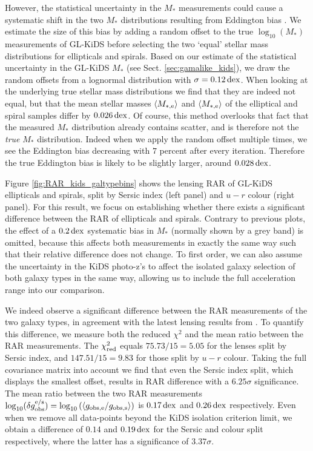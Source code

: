 \documentclass[usenatbib]{mnras}
\newcommand{\lan}{\langle}
\newcommand{\ran}{\rangle}
\newcommand{\un}[1]{_{\rm #1}}
\newcommand{\dex}{\, {\rm dex}}
\begin{document}
However, the statistical uncertainty in the $M_*$ measurements could cause a systematic shift in the two $M_*$ distributions resulting from Eddington bias \cite[]{eddington1913}. We estimate the size of this bias by adding a random offset to the true $\log_{10}(M_*)$ measurements of GL-KiDS before selecting the two `equal' stellar mass distributions for ellipticals and spirals. Based on our estimate of the statistical uncertainty in the GL-KiDS $M_*$ (see Sect. \ref{sec:gamalike_kids}), we draw the random offsets from a lognormal distribution with $\sigma = 0.12 \dex$. When looking at the underlying true stellar mass distributions we find that they are indeed not equal, but that the mean stellar masses $\lan M\un{*,e} \ran$ and $\lan M\un{*,e} \ran$ of the elliptical and spiral samples differ by $0.026 \dex$. Of course, this method overlooks that fact that the measured $M_*$ distribution already contains scatter, and is therefore not the \emph{true} $M_*$ distribution. Indeed when we apply the random offset multiple times, we see the Eddington bias decreasing with $7$ percent after every iteration. Therefore the true Eddington bias is likely to be slightly larger, around $0.028 \dex$.

Figure \ref{fig:RAR_kids_galtypebins} shows the lensing RAR of GL-KiDS ellipticals and spirals, split by Sersic index (left panel) and $u-r$ colour (right panel). For this result, we focus on establishing whether there exists a significant difference between the RAR of ellipticals and spirals. Contrary to previous plots, the effect of a $0.2 \dex$ systematic bias in $M_*$ (normally shown by a grey band) is omitted, because this affects both measurements in exactly the same way such that their relative difference does not change. To first order, we can also assume the uncertainty in the KiDS photo-z's to affect the isolated galaxy selection of both galaxy types in the same way, allowing us to include the full acceleration range into our comparison.

We indeed observe a significant difference between the RAR measurements of the two galaxy types, in agreement with the latest lensing results from \cite{taylor2020}. To quantify this difference, we measure both the reduced $\chi^2$ and the mean ratio between the RAR measurements. The $\chi\un{red}^2$ equals $75.73 / 15 = 5.05$ for the lenses split by Sersic index, and $147.51 / 15 = 9.83$ for those split by $u-r$ colour. Taking the full covariance matrix into account we find that even the Sersic index split, which displays the smallest offset, results in RAR difference with a $6.25 \sigma$ significance. The mean ratio between the two RAR measurements $\log_{10}(\delta g\un{obs}^{\rm e/s}) = \log_{10}\left( \langle g\un{obs,e} / g\un{obs,s}\rangle \right)$ is $0.17 \dex$ and $0.26 \dex$ respectively. Even when we remove all data-points beyond the KiDS isolation criterion limit, we obtain a difference of $0.14$ and $0.19 \dex$ for the Sersic and colour split respectively, where the latter has a significance of $3.37 \sigma$.
\end{document}
